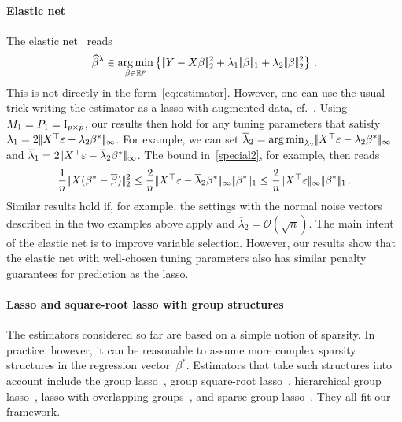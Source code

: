 \documentclass[bj]{imsart}
\newcommand{\normsup}[1]{\ensuremath{\!|\!| #1 | \! |_{\infty}}}
\newcommand{\normone}[1]{\ensuremath{\!|\!| #1 | \! |_{1}}}
\newcommand{\normtwo}[1]{\ensuremath{\!|\!| #1 | \! |_{2}}}
\newcommand{\1}{{\rm 1}\mskip -4,5mu{\rm l} }
\newcommand{\argmin}{\mathop{\mathrm{arg\,min}}}
\newcommand{\rp}{\mathbb{R}^p}
\newcommand{\betatrue}{\beta^*}
\newcommand{\lo}{\overline{\lambda}}
\begin{document}
\paragraph{Elastic net} The elastic net~\cite{Zou05} reads
\begin{equation*}
  \estimatort \in \argmin_{\beta\in\rp}\left\{\,\normtwo{\outcome-\design\beta}^2+\tuningparameter_1\,\normone{\beta}+\tuningparameter_2\,\normtwo{\beta}^2\right\}\,.
\end{equation*}
This is not directly in the form~\eqref{eq:estimator}. However, one can use the usual trick writing the estimator as a lasso with augmented data, cf.~\cite[Lemma~1]{Hebiri11}. Using $M_1=P_1=\operatorname{I}_{p\times p}$, our results then hold for any  tuning parameters that satisfy $\tuningparameter_1=2\,\normsup{\design^\top\noise-\tuningparameter_2\betatrue}$. For example, we can set $\lo_2=\argmin_{\tuningparameter_2}\normsup{\design^\top\noise-\tuningparameter_2\betatrue}$ and $\lo_1=2\,\normsup{\design^\top\noise-\lo_2\betatrue}$. The bound in~\eqref{special2}, for example, then reads
\begin{equation*}
\frac{1}{n}\,\normtwo{\design(\betatrue-\estimatororacle)}^2\le \frac{2}{n}\, \normsup{\design^\top\noise-\lo_2\betatrue}\,\normone{\betatrue} \le \frac{2}{n}\,\normsup{\design  ^\top\noise}\,   \normone{\betatrue}\,.
\end{equation*} 
Similar results hold if, for example, the settings with the normal noise vectors described in the two examples above apply and $\lo_2=\mathcal O(\sqrt n).$ The main intent of the elastic net is to improve variable selection. However, our results show that the elastic net with well-chosen tuning parameters also has similar penalty guarantees for prediction as the lasso.



\paragraph{Lasso and square-root lasso with group structures} The estimators considered so far are based on a simple notion of sparsity. In practice, however, it can be reasonable to assume more complex sparsity structures in the regression vector~$\betatrue.$ Estimators that take such structures into account include the group lasso~\cite{YuanLin06}, group square-root lasso~\cite{Yoyo13}, hierarchical group lasso~\cite{Bien13}, lasso with overlapping groups~\cite{Jacob09}, and sparse group lasso~\cite{Simon13}. They all fit our framework. 
\end{document}
